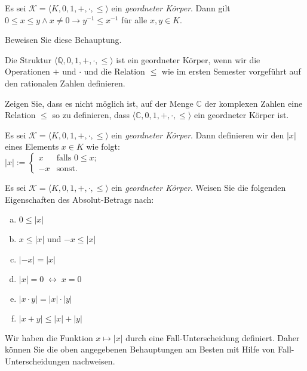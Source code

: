 \begin{Lemma} 
  Es sei  $\mathcal{K} = \langle K, 0, 1, +, \cdot, \leq \rangle$ ein \emph{geordneter Körper}.
  Dann gilt
  \\[0.2cm]
  \hspace*{1.3cm} $0 \leq x \leq y \wedge x \not= 0 \rightarrow y^{-1} \leq x^{-1}$
  \quad für alle $x, y \in K$.  
\end{Lemma}

\exercise
Beweisen Sie diese Behauptung.  \eox

\example
Die Struktur $\langle \mathbb{Q}, 0, 1, +, \cdot, \leq \rangle$ ist ein geordneter Körper, wenn wir
die Operationen $+$ und $\cdot$ und die Relation $\leq$ wie im ersten Semester vorgeführt auf den rationalen Zahlen
definieren.  
\eox

\exercise
Zeigen Sie, dass es nicht möglich ist, auf der Menge $\mathbb{C}$ der komplexen Zahlen eine Relation
$\leq$ so zu definieren, dass $\langle \mathbb{C}, 0, 1, +, \cdot, \leq \rangle$ ein geordneter
Körper ist. \eox

\begin{Definition}
  Es sei  $\mathcal{K} = \langle K, 0, 1, +, \cdot, \leq \rangle$ ein \emph{geordneter Körper}.
  Dann definieren wir den  $|x|$ eines Elements $x \in K$ wie folgt:
  \\[0.2cm]
  \hspace*{1.3cm}
  $|x| := \left\{
  \begin{array}{rl}
     x & \mbox{falls $0 \leq x$};  \\[0.1cm]
    -x & \mbox{sonst.}
  \end{array}
  \right.
  $\eox
\end{Definition}

\exercise
Es sei  $\mathcal{K} = \langle K, 0, 1, +, \cdot, \leq \rangle$ ein \emph{geordneter Körper}.
Weisen Sie die folgenden Eigenschaften des Absolut-Betrags nach:
\begin{enumerate}[(a)]
\item $0 \leq |x|$
\item $x \leq |x|$ \quad und \quad $-x \leq |x|$
\item $|-x| = |x|$
\item $|x| = 0 \;\leftrightarrow\; x = 0$
\item $|x \cdot y| = |x| \cdot |y|$
\item $|x+y| \leq |x| + |y|$ 
\end{enumerate}

\hint
Wir haben die Funktion $x \mapsto |x|$ durch eine Fall-Unterscheidung definiert.  Daher können Sie die oben
angegebenen Behauptungen am Besten mit Hilfe von Fall-Unterscheidungen nachweisen.
\eox
\vspace*{0.2cm}

